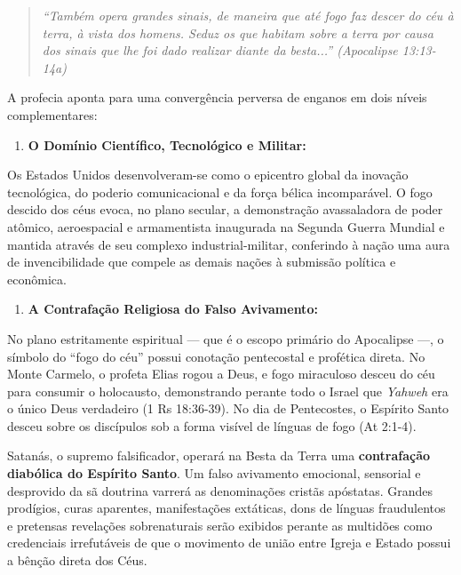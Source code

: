 \documentclass[11pt,a4paper,openany]{book}
\begin{document}
\begin{quote}
\itshape \textit{``Também opera grandes sinais, de maneira que até fogo faz descer do céu à terra, à vista dos homens. Seduz os que habitam sobre a terra por causa dos sinais que lhe foi dado realizar diante da besta...''} (Apocalipse 13:13-14a)
\end{quote}


A profecia aponta para uma convergência perversa de enganos em dois níveis complementares:

\begin{enumerate}
  \item \textbf{O Domínio Científico, Tecnológico e Militar:}
\end{enumerate}

Os Estados Unidos desenvolveram-se como o epicentro global da inovação tecnológica, do poderio comunicacional e da força bélica incomparável. O fogo descido dos céus evoca, no plano secular, a demonstração avassaladora de poder atômico, aeroespacial e armamentista inaugurada na Segunda Guerra Mundial e mantida através de seu complexo industrial-militar, conferindo à nação uma aura de invencibilidade que compele as demais nações à submissão política e econômica.

\begin{enumerate}
  \item \textbf{A Contrafação Religiosa do Falso Avivamento:}
\end{enumerate}

No plano estritamente espiritual — que é o escopo primário do Apocalipse —, o símbolo do ``fogo do céu'' possui conotação pentecostal e profética direta. No Monte Carmelo, o profeta Elias rogou a Deus, e fogo miraculoso desceu do céu para consumir o holocausto, demonstrando perante todo o Israel que \textit{Yahweh} era o único Deus verdadeiro (1 Rs 18:36-39). No dia de Pentecostes, o Espírito Santo desceu sobre os discípulos sob a forma visível de línguas de fogo (At 2:1-4).

Satanás, o supremo falsificador, operará na Besta da Terra uma \textbf{contrafação diabólica do Espírito Santo}. Um falso avivamento emocional, sensorial e desprovido da sã doutrina varrerá as denominações cristãs apóstatas. Grandes prodígios, curas aparentes, manifestações extáticas, dons de línguas fraudulentos e pretensas revelações sobrenaturais serão exibidos perante as multidões como credenciais irrefutáveis de que o movimento de união entre Igreja e Estado possui a bênção direta dos Céus.
\end{document}
